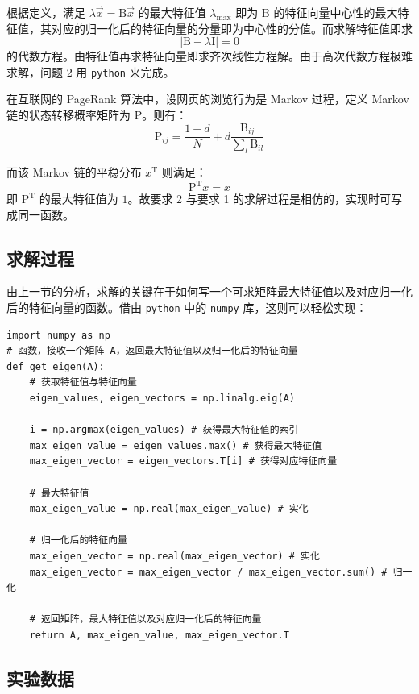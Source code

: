 \documentclass{article}
\begin{document}
根据定义，满足 $\lambda\vec{x}={\mathrm{B}}\vec{x}$ 的最大特征值 $\lambda_{\mathrm{max}}$ 即为 $\mathrm{B}$ 的特征向量中心性的最大特征值，其对应的归一化后的特征向量的分量即为中心性的分值。而求解特征值即求
$$
\vert {\mathrm{B}} - \lambda{\mathrm{I}}\vert =0
$$
的代数方程。由特征值再求特征向量即求齐次线性方程解。由于高次代数方程极难求解，问题 2 用 \lstinline{python} 来完成。

在互联网的 PageRank 算法中，设网页的浏览行为是 Markov 过程，定义 Markov 链的状态转移概率矩阵为 $\mathrm{P}$。则有：
$$
{\mathrm{P}}_{ij}=\frac{1-d}{N}+d\frac{{\mathrm{B}}_{ij}}{\sum_{l}{\mathrm{B}}_{il}}
$$

而该 Markov 链的平稳分布 $x^{\mathrm{T}}$ 则满足：
$$
{\mathrm{P}^{\mathrm{T}}x}=x
$$
即 $\mathrm{P}^{\mathrm{T}}$ 的最大特征值为 $1$。故要求 2 与要求 1 的求解过程是相仿的，实现时可写成同一函数。

\subsection{求解过程}

由上一节的分析，求解的关键在于如何写一个可求矩阵最大特征值以及对应归一化后的特征向量的函数。借由 \lstinline{python} 中的 \lstinline{numpy} 库，这则可以轻松实现：
\begin{lstlisting}
import numpy as np
# 函数，接收一个矩阵 A，返回最大特征值以及归一化后的特征向量
def get_eigen(A):
    # 获取特征值与特征向量
    eigen_values, eigen_vectors = np.linalg.eig(A)

    i = np.argmax(eigen_values) # 获得最大特征值的索引
    max_eigen_value = eigen_values.max() # 获得最大特征值
    max_eigen_vector = eigen_vectors.T[i] # 获得对应特征向量

    # 最大特征值
    max_eigen_value = np.real(max_eigen_value) # 实化

    # 归一化后的特征向量
    max_eigen_vector = np.real(max_eigen_vector) # 实化
    max_eigen_vector = max_eigen_vector / max_eigen_vector.sum() # 归一化

    # 返回矩阵，最大特征值以及对应归一化后的特征向量
    return A, max_eigen_value, max_eigen_vector.T
\end{lstlisting}

\subsection{实验数据}
\end{document}
